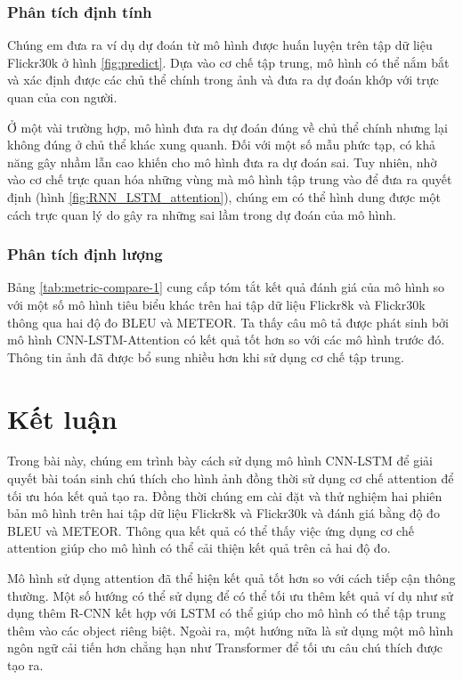 \documentclass[conference]{IEEEtran}
\begin{document}
\subsubsection{Phân tích định tính}
Chúng em đưa ra ví dụ dự đoán từ mô hình được huấn luyện trên tập dữ liệu Flickr30k ở hình \ref{fig:predict}. Dựa vào cơ chế tập trung, mô hình có thể nắm bắt và xác định được các chủ thể chính trong ảnh và đưa ra dự đoán khớp với trực quan của con người.

Ở một vài trường hợp, mô hình đưa ra dự đoán đúng về chủ thể chính nhưng lại không đúng ở chủ thể khác xung quanh. Đối với một số mẫu phức tạp, có khả năng gây nhầm lẫn cao khiến cho mô hình đưa ra dự đoán sai. Tuy nhiên, nhờ vào cơ chế trực quan hóa những vùng mà mô hình tập trung vào để đưa ra quyết định (hình \ref{fig:RNN_LSTM_attention}), chúng em có thể hình dung được một cách trực quan lý do gây ra những sai lầm trong dự đoán của mô hình.

\subsubsection{Phân tích định lượng}
Bảng \ref{tab:metric-compare-1} cung cấp tóm tắt kết quả đánh giá của mô hình so với một số mô hình tiêu biểu khác trên hai tập dữ liệu Flickr8k và Flickr30k thông qua hai độ đo BLEU và METEOR.
Ta thấy câu mô tả được phát sinh bởi mô hình CNN-LSTM-Attention có kết quả tốt hơn so với các mô hình trước đó.
Thông tin ảnh đã được bổ sung nhiều hơn khi sử dụng cơ chế tập trung.

\section{Kết luận}
Trong bài này, chúng em trình bày cách sử dụng mô hình CNN-LSTM để giải quyết bài toán sinh chú thích cho hình ảnh đồng thời sử dụng cơ chế attention để tối ưu hóa kết quả tạo ra. Đồng thời chúng em cài đặt và thử nghiệm hai phiên bản mô hình trên hai tập dữ liệu Flickr8k và Flickr30k và đánh giá bằng độ đo BLEU và METEOR. Thông qua kết quả có thể thấy việc ứng dụng cơ chế attention giúp cho mô hình có thể cải thiện kết quả trên cả hai độ đo. 

Mô hình sử dụng attention đã thể hiện kết quả tốt hơn so với cách tiếp cận thông thường. Một số hướng có thể sử dụng để có thể tối ưu thêm kết quả ví dụ như sử dụng thêm R-CNN kết hợp với LSTM có thể giúp cho mô hình có thể tập trung thêm vào các object riêng biệt. Ngoài ra, một hướng nữa là sử dụng một mô hình ngôn ngữ cải tiến hơn chẳng hạn như Transformer để tối ưu câu chú thích được tạo ra. 

\renewcommand{\refname}{Tài liệu tham khảo}


\end{document}
